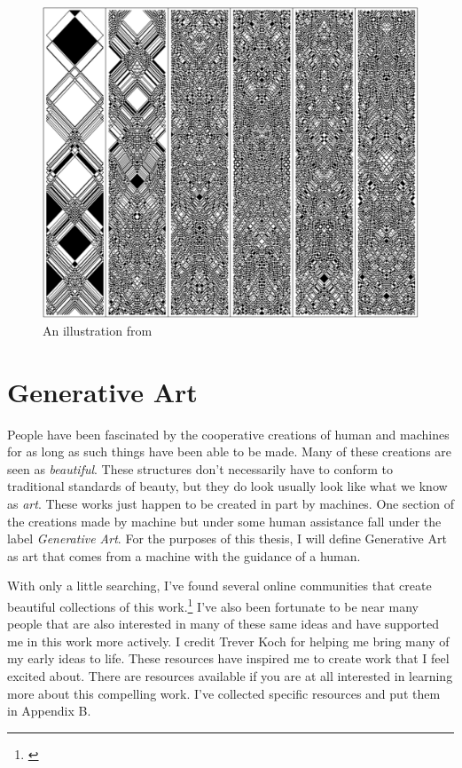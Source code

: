 \documentclass[12pt,twoside]{reedthesis}
\begin{document}
	\begin{figure}[H]
	\centering
	\includegraphics[width=0.6\linewidth]{Images/Wolfram}
	\caption{An illustration from \cite{wolfram2002}}
	\label{Wolfram}
	\end{figure}

\section{Generative Art}
\label{GenerativeArt}

	People have been fascinated by the cooperative creations of human and machines for as long as such things have been able to be made. Many of these creations are seen as \textit{beautiful}. These structures don't necessarily have to conform to traditional standards of beauty, but they do look usually look like what we know as \textit{art}. These works just happen to be created in part by machines. One section of the creations made by machine but under some human assistance fall under the label \textit{Generative Art}. For the purposes of this thesis, I will define Generative Art as art that comes from a machine with the guidance of a human.
	
	With only a little searching, I've found several online communities that create beautiful collections of this work.\footnote{\cite{reddit2023}} I've also been fortunate to be near many people that are also interested in many of these same ideas and have supported me in this work more actively. I credit Trever Koch for helping me bring many of my early ideas to life. These resources have inspired me to create work that I feel excited about. There are resources available if you are at all interested in learning more about this compelling work. I've collected specific resources and put them in Appendix B.
	
	
\end{document}
